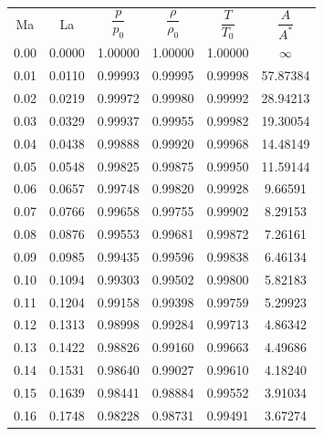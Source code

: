 \fancyfoot[C]{} %
\small

\section*{}
\\ \vspace{4mm}%
\begin{minipage}{0.48\textwidth}
    \centering
    \begin{tabular}{c|c|c|c|c|c}
        Ma & La & $\dfrac{p}{p_0}$ & $\dfrac{\rho}{\rho_0}$ & $\dfrac{T}{T_0}$ & $\dfrac{A}{A^*}$ \\[2.2ex] \arrayrulecolor{Blue}\hline\arrayrulecolor{black}
        0.00 & 0.0000 & 1.00000 & 1.00000 & 1.00000 & $\infty$ \\
        0.01 & 0.0110 & 0.99993 & 0.99995 & 0.99998 & 57.87384 \\
        0.02 & 0.0219 & 0.99972 & 0.99980 & 0.99992 & 28.94213 \\
        0.03 & 0.0329 & 0.99937 & 0.99955 & 0.99982 & 19.30054 \\
        0.04 & 0.0438 & 0.99888 & 0.99920 & 0.99968 & 14.48149 \\
        0.05 & 0.0548 & 0.99825 & 0.99875 & 0.99950 & 11.59144 \\
        0.06 & 0.0657 & 0.99748 & 0.99820 & 0.99928 & 9.66591 \\
        0.07 & 0.0766 & 0.99658 & 0.99755 & 0.99902 & 8.29153 \\
        0.08 & 0.0876 & 0.99553 & 0.99681 & 0.99872 & 7.26161 \\
        0.09 & 0.0985 & 0.99435 & 0.99596 & 0.99838 & 6.46134 \\
        0.10 & 0.1094 & 0.99303 & 0.99502 & 0.99800 & 5.82183 \\
        0.11 & 0.1204 & 0.99158 & 0.99398 & 0.99759 & 5.29923 \\
        0.12 & 0.1313 & 0.98998 & 0.99284 & 0.99713 & 4.86342 \\
        0.13 & 0.1422 & 0.98826 & 0.99160 & 0.99663 & 4.49686 \\
        0.14 & 0.1531 & 0.98640 & 0.99027 & 0.99610 & 4.18240 \\
        0.15 & 0.1639 & 0.98441 & 0.98884 & 0.99552 & 3.91034 \\
        0.16 & 0.1748 & 0.98228 & 0.98731 & 0.99491 & 3.67274 \\

\end{tabular}
\end{minipage}

